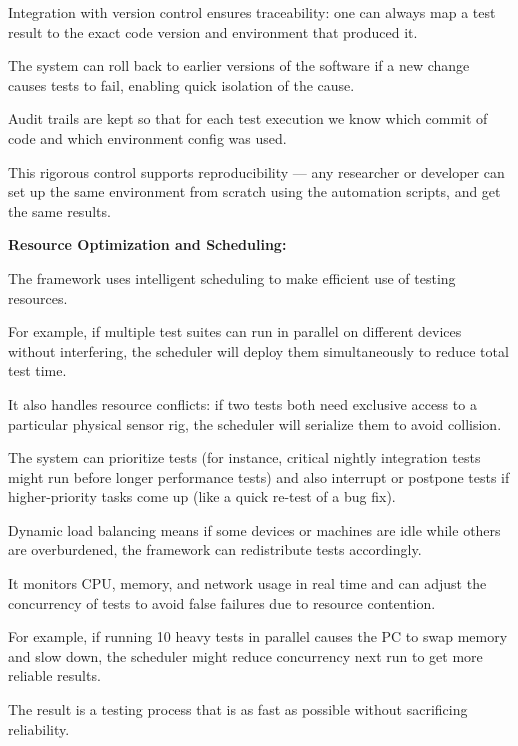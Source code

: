 {{Integration with version control ensures traceability: one can always map a test
result to the exact code version and environment that produced it.

The system can roll back to earlier versions of the software if a new change causes
tests to fail, enabling quick isolation of the cause.

Audit trails are kept so that for each test execution we know which commit of code
and which environment config was used.

This rigorous control supports reproducibility --- any researcher or developer can
set up the same environment from scratch using the automation scripts, and get the
same results.

\textbf{Resource Optimization and Scheduling:}

The framework uses intelligent scheduling to make efficient use of testing resources.

For example, if multiple test suites can run in parallel on different devices without
interfering, the scheduler will deploy them simultaneously to reduce total test time.

It also handles resource conflicts: if two tests both need exclusive access to a
particular physical sensor rig, the scheduler will serialize them to avoid collision.

The system can prioritize tests (for instance, critical nightly integration tests
might run before longer performance tests) and also interrupt or postpone tests if
higher-priority tasks come up (like a quick re-test of a bug fix).

Dynamic load balancing means if some devices or machines are idle while others are
overburdened, the framework can redistribute tests accordingly.

It monitors CPU, memory, and network usage in real time and can adjust the
concurrency of tests to avoid false failures due to resource contention.

For example, if running 10 heavy tests in parallel causes the PC to swap memory and
slow down, the scheduler might reduce concurrency next run to get more reliable
results.

The result is a testing process that is as fast as possible without sacrificing
reliability.

}}
